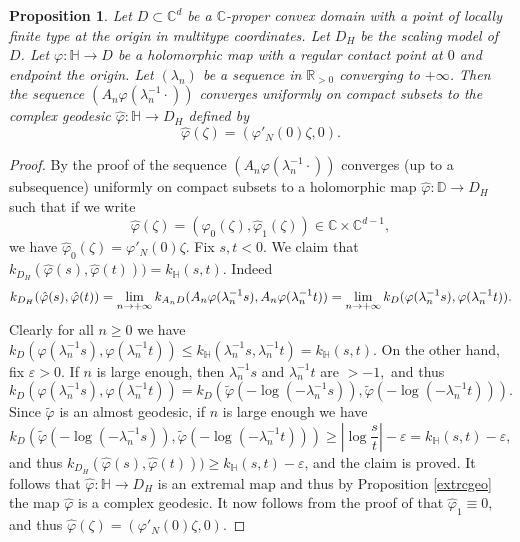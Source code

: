 \documentclass[11pt, reqno]{amsart}
\numberwithin{equation}{section}
\newtheorem{proposition}[theorem]{Proposition}
\theoremstyle{definition}
\newcommand{\C}{\mathbb{C}}
\newcommand{\D}{\mathbb{D}}
\newcommand{\R}{\mathbb{R}}
\renewcommand{\H}{\mathbb{H}}
\begin{document}
{		\begin{proposition}\label{scaling1}
			Let $D\subset\C^d$ be a $\C$-proper convex domain with a point of locally finite type at the origin in multitype coordinates.
			Let $D_H$ be the scaling model of $D$.
			Let $\varphi\colon \H\to D$ be a holomorphic map with a regular contact point at $0$ and endpoint the origin.  Let $(\lambda_n)$ be a sequence in $\R_{>0}$ converging to $+\infty$. Then the sequence $(A_n\varphi(\lambda_n^{-1}\cdot))$ converges  uniformly on compact subsets to the complex geodesic $\hat\varphi\colon \H\to D_H$ defined by $$\hat{\varphi}(\zeta)=(\varphi'_N(0)\zeta,0).$$ 
		\end{proposition}
		\begin{proof}
			By the proof of \cite[Lemma 5.13]{AFGG} the sequence  $(A_n\varphi(\lambda_n^{-1}\cdot))$ converges (up to a subsequence) uniformly on compact subsets to a holomorphic
			map $\hat\varphi\colon \D\to D_H$ such that if we write $$\hat\varphi(\zeta)=(\hat\varphi_0(\zeta),\hat\varphi_1(\zeta))\in\C\times\C^{d-1},$$ we have
			$\hat\varphi_0(\zeta)=\varphi'_N(0)\zeta.$
			Fix $s,t<0$. We claim that $k_{D_H}(\hat \varphi(s),\hat \varphi(t)))=k_\H(s,t).$
			Indeed
			$$ k_{D_H}(\hat \varphi(s),\hat \varphi(t))=\lim_{n\to+\infty} k_{A_nD}(A_n\varphi(\lambda_n^{-1}s),A_n\varphi(\lambda_n^{-1}t))\\=\lim_{n\to+\infty} k_{D}(\varphi(\lambda_n^{-1}s),\varphi(\lambda_n^{-1}t)).$$
			Clearly for all $n\geq 0$ we have $k_{D}(\varphi(\lambda_n^{-1}s),\varphi(\lambda_n^{-1}t))\leq  k_\H(\lambda_n^{-1}s,\lambda_n^{-1}t)=k_\H(s,t)$.
			On the other hand, fix $\varepsilon>0$.  
			If $n$ is large enough, then $\lambda_n^{-1}s$ and $\lambda_n^{-1}t$ are $>-1,$ and thus
			$$ k_{D}(\varphi(\lambda_n^{-1}s),\varphi(\lambda_n^{-1}t))= k_D(\tilde \varphi(-\log(-\lambda_n^{-1}s)),\tilde \varphi(-\log(-\lambda_n^{-1}t))).$$
			Since $\tilde\varphi$ is an almost geodesic, if $n$ is large enough we have $$k_D(\tilde \varphi(-\log(-\lambda_n^{-1}s)),\tilde \varphi(-\log(-\lambda_n^{-1}t)))\geq \left|\log\frac{s}{t}\right|-\varepsilon=k_\H(s,t)-\varepsilon,$$
			and thus $k_{D_H}(\hat \varphi(s),\hat \varphi(t)))\geq k_\H(s,t)-\varepsilon$, and the claim is proved.
			It follows  that $\hat \varphi\colon \H\to D_H$ is an extremal map and thus by Proposition \ref{extrcgeo} the map  $\hat\varphi$ is a complex geodesic.
			It now follows from the proof of \cite[Lemma 5.13]{AFGG} that $\hat\varphi_1\equiv0$, and thus
			$\hat{\varphi}(\zeta)=(\varphi'_N(0)\zeta,0).$
		\end{proof}
		
}
\end{document}
